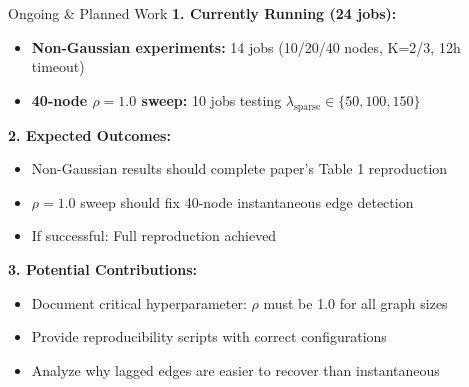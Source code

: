 \documentclass[aspectratio=169]{beamer}
\begin{document}
\begin{frame}{Ongoing \& Planned Work}
\textbf{1. Currently Running (24 jobs):}
\begin{itemize}
    \item \textbf{Non-Gaussian experiments:} 14 jobs (10/20/40 nodes, K=2/3, 12h timeout)
    \item \textbf{40-node $\rho=1.0$ sweep:} 10 jobs testing $\lambda_{\text{sparse}} \in \{50, 100, 150\}$
\end{itemize}

\vspace{0.3cm}
\textbf{2. Expected Outcomes:}
\begin{itemize}
    \item Non-Gaussian results should complete paper's Table 1 reproduction
    \item $\rho=1.0$ sweep should fix 40-node instantaneous edge detection
    \item If successful: Full reproduction achieved
\end{itemize}

\vspace{0.3cm}
\textbf{3. Potential Contributions:}
\begin{itemize}
    \item Document critical hyperparameter: $\rho$ must be 1.0 for all graph sizes
    \item Provide reproducibility scripts with correct configurations
    \item Analyze why lagged edges are easier to recover than instantaneous
\end{itemize}
\end{frame}
\end{document}
